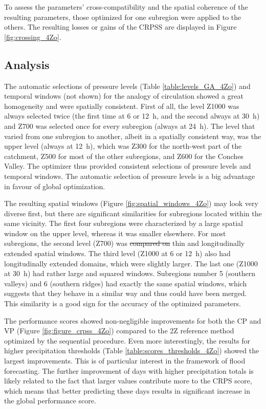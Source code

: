 \documentclass[review]{elsarticle}
\providecommand{\DIFaddtex}[1]{{\protect\color{blue}\uwave{#1}}} %
\providecommand{\DIFdeltex}[1]{{\protect\color{red}\sout{#1}}}                      %
\providecommand{\DIFaddbegin}{} %
\providecommand{\DIFaddend}{} %
\providecommand{\DIFdelbegin}{} %
\providecommand{\DIFdelend}{} %
\providecommand{\DIFadd}[1]{\texorpdfstring{\DIFaddtex{#1}}{#1}} %
\providecommand{\DIFdel}[1]{\texorpdfstring{\DIFdeltex{#1}}{}} %
\begin{document}
To assess the parameters’ cross-compatibility and the spatial coherence of the resulting parameters, those optimized for one subregion were applied to the others. The resulting losses or gains of the CRPSS are displayed in Figure \ref{fig:crossing_4Zo}.


\subsection{Analysis}

The automatic selections of pressure levels (Table \ref{table:levels_GA_4Zo}) and temporal windows (not shown) for the analogy of circulation showed a great homogeneity and were spatially consistent. First of all, the level Z1000 was always selected twice (the first time at 6 or 12~h, and the second always at 30~h) and Z700 was selected once for every subregion (always at 24~h). The level that varied from one subregion to another, albeit in a spatially consistent way, was the upper level (always at 12~h), which was Z300 for the north-west part of the catchment, Z500 for most of the other subregions, and Z600 for the Conches Valley. The optimizer thus provided consistent selections of pressure levels and temporal windows. The automatic selection of pressure levels is a big advantage in favour of global optimization.

The resulting spatial windows (Figure \ref{fig:spatial_windows_4Zo}) may look very diverse first, but there are significant similarities for subregions located within the same vicinity. The first four subregions were characterized by a large spatial window on the upper level, whereas it was smaller elsewhere. For most subregions, the second level (Z700) was \DIFdelbegin \DIFdel{compared on }\DIFdelend \DIFaddbegin \DIFadd{characterized by }\DIFaddend thin and longitudinally extended spatial windows. The third level (Z1000 at 6 or 12~h) also had longitudinally extended domains, which were slightly larger. The last one (Z1000 at 30~h) had rather large and squared windows. Subregions number 5 (southern valleys) and 6 (southern ridges) had exactly the same spatial windows, which suggests that they behave in a similar way and thus could have been merged. This similarity is a good sign for the accuracy of the optimized parameters.

The performance scores showed non-negligible improvements for both the CP and VP (Figure \ref{fig:figure_crpss_4Zo}) compared to the 2Z reference method optimized by the sequential procedure. Even more interestingly, the results for higher precipitation thresholds (Table \ref{table:scores_thresholds_4Zo}) showed the largest improvements. This is of particular interest in the framework of flood forecasting. The further improvement of days with higher precipitation totals is likely related to the fact that larger values contribute more to the CRPS score, which means that better predicting these days results in significant increase in the global performance score.
\end{document}
